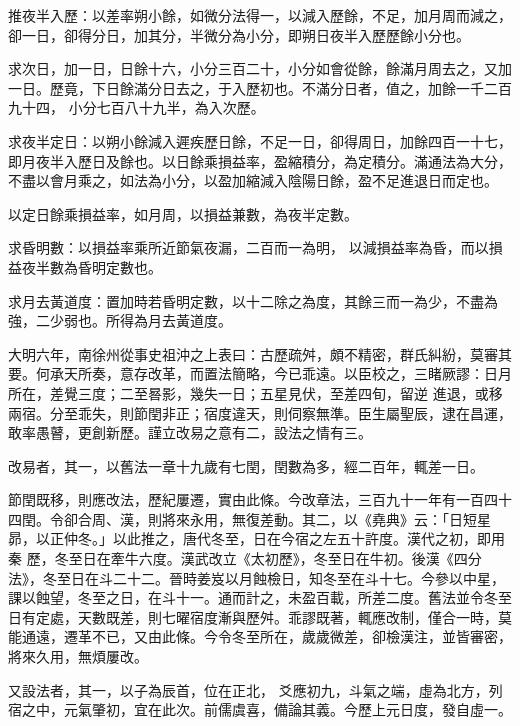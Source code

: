 \begin{pinyinscope}
 推夜半入歷：以差率朔小餘，如微分法得一，以減入歷餘，不足，加月周而減之，卻一日，卻得分日，加其分，半微分為小分，即朔日夜半入歷歷餘小分也。



 求次日，加一日，日餘十六，小分三百二十，小分如會從餘，餘滿月周去之，又加一日。歷竟，下日餘滿分日去之，于入歷初也。不滿分日者，值之，加餘一千二百九十四，
 小分七百八十九半，為入次歷。



 求夜半定日：以朔小餘減入遲疾歷日餘，不足一日，卻得周日，加餘四百一十七，即月夜半入歷日及餘也。以日餘乘損益率，盈縮積分，為定積分。滿通法為大分，不盡以會月乘之，如法為小分，以盈加縮減入陰陽日餘，盈不足進退日而定也。



 以定日餘乘損益率，如月周，以損益兼數，為夜半定數。



 求昏明數：以損益率乘所近節氣夜漏，二百而一為明，
 以減損益率為昏，而以損益夜半數為昏明定數也。



 求月去黃道度：置加時若昏明定數，以十二除之為度，其餘三而一為少，不盡為強，二少弱也。所得為月去黃道度。



 大明六年，南徐州從事史祖沖之上表曰：古歷疏舛，頗不精密，群氏糾紛，莫審其要。何承天所奏，意存改革，而置法簡略，今已乖遠。以臣校之，三睹厥謬：日月所在，差覺三度；二至晷影，幾失一日；五星見伏，至差四旬，留逆
 進退，或移兩宿。分至乖失，則節閏非正；宿度違天，則伺察無準。臣生屬聖辰，逮在昌運，敢率愚瞽，更創新歷。謹立改易之意有二，設法之情有三。



 改易者，其一，以舊法一章十九歲有七閏，閏數為多，經二百年，輒差一日。



 節閏既移，則應改法，歷紀屢遷，實由此條。今改章法，三百九十一年有一百四十四閏。令卻合周、漢，則將來永用，無復差動。其二，以《堯典》云：「日短星昴，以正仲冬。」以此推之，唐代冬至，日在今宿之左五十許度。漢代之初，即用秦
 歷，冬至日在牽牛六度。漢武改立《太初歷》，冬至日在牛初。後漢《四分法》，冬至日在斗二十二。晉時姜岌以月蝕檢日，知冬至在斗十七。今參以中星，課以蝕望，冬至之日，在斗十一。通而計之，未盈百載，所差二度。舊法並令冬至日有定處，天數既差，則七曜宿度漸與歷舛。乖謬既著，輒應改制，僅合一時，莫能通遠，遷革不已，又由此條。今令冬至所在，歲歲微差，卻檢漢注，並皆審密，將來久用，無煩屢改。



 又設法者，其一，以子為辰首，位在正北，
 爻應初九，斗氣之端，虛為北方，列宿之中，元氣肇初，宜在此次。前儒虞喜，備論其義。今歷上元日度，發自虛一。




\end{pinyinscope}

